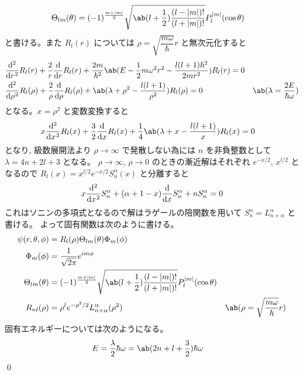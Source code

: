 \documentclass[uplatex,dvipdfmx,a4paper,11pt]{jlreq}
\makeatletter
\numberwithin{equation}{section}
\theoremstyle{definition}
\renewenvironment{proof}[1][\proofname]{\par
  \normalfont
  \topsep6\p@\@plus6\p@ \trivlist
  \item[\hskip\labelsep{\bfseries #1}\@addpunct{\bfseries}]\ignorespaces\quad\par
}{%
  \qed\endtrivlist\@endpefalse
}
\renewcommand\proofname{証明}
\makeatother
\begin{document}
\begin{proof}
  \begin{align}
    \Theta_{lm}(\theta) & = (-1)^{\frac{m + |m|}{2}}\sqrt{\ab(l + \frac{1}{2})\frac{(l - |m|)!}{(l + |m|)!}}P_l^{|m|}(\cos\theta)
  \end{align}
  と書ける。また $R_l(r)$ については $\rho = \sqrt{\dfrac{m\omega}{\hbar}}r$ と無次元化すると
  \begin{align}
     & \diff[2]{}{r}R_l(r) + \frac{2}{r}\diff{}{r}R_l(r) + \frac{2m}{\hbar^2}\ab(E - \frac{1}{2}m\omega^2r^2 - \frac{l(l+1)\hbar^2}{2m r^2})R_l(r) = 0                                         \\
     & \diff[2]{}{\rho}R_l(\rho) + \frac{2}{\rho}\diff{}{\rho}R_l(\rho) + \ab(\lambda + \rho^2 - \frac{l(l+1)}{\rho^2})R_l(\rho) = 0                   & \ab(\lambda = \frac{2E}{\hbar\omega})
  \end{align}
  となる。$x = \rho^2$ と変数変換すると
  \begin{align}
     & x\diff[2]{}{x}R_l(x) + \frac{3}{2}\diff{}{x}R_l(x) + \frac{1}{4}\ab(\lambda + x - \frac{l(l+1)}{x})R_l(x) = 0
  \end{align}
  となり, 級数展開法より $\rho\to\infty$ で発散しない為には $n$ を非負整数として $\lambda = 4n + 2l + 3$ となる。
  $\rho\to\infty$, $\rho\to 0$ のときの漸近解はそれぞれ $e^{-x/2}$, $x^{l/2}$ となるので $R_l(x) = x^{l/2}e^{-x/2}S_n^\alpha(x)$ と分離すると
  \begin{align}
    x\diff[2]{}{x}S_n^\alpha + (\alpha + 1 - x)\diff{}{x}S_n^\alpha + nS_n^\alpha = 0
  \end{align}
  これはソニンの多項式となるので解はラゲールの陪関数を用いて $S_n^\alpha = L_{n + \alpha}^\alpha$ と書ける。
  よって固有関数は次のように書ける。
  \begin{align}
    \psi(r, \theta, \phi) & = R_l(\rho)\Theta_{lm}(\theta)\Phi_m(\phi)                                                                                                           \\
    \Phi_m(\phi)          & = \frac{1}{\sqrt{2\pi}}e^{im\phi}                                                                                                                    \\
    \Theta_{lm}(\theta)   & = (-1)^{\frac{m + |m|}{2}}\sqrt{\ab(l + \frac{1}{2})\frac{(l - |m|)!}{(l + |m|)!}}P_l^{|m|}(\cos\theta)                                              \\
    R_{nl}(\rho)          & = \rho^{l}e^{-\rho^2/2}L_{n + \alpha}^\alpha(\rho^2)                                                    & \ab(\rho = \sqrt{\dfrac{m\omega}{\hbar}}r)
  \end{align}
  固有エネルギーについては次のようになる。
  \begin{align}
    E & = \frac{\lambda}{2}\hbar\omega = \ab(2n + l + \frac{3}{2})\hbar\omega
  \end{align}
\end{proof}
\end{document}
